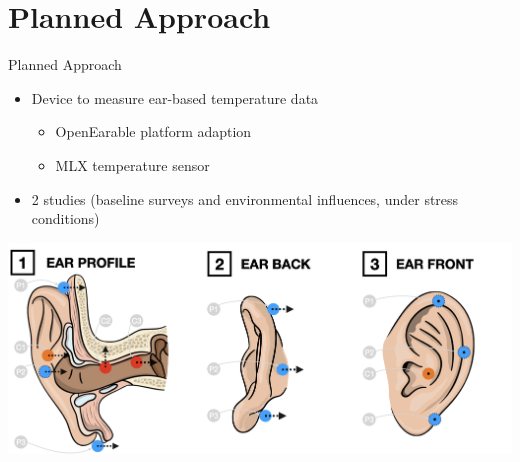 \documentclass[en]{sdqbeamer}
\begin{document}

\section{Planned Approach}
\begin{frame}{Planned Approach}
    \begin{itemize}
        \item Device to measure ear-based temperature data
        \begin{itemize}
            \item OpenEarable platform adaption
            \item MLX temperature sensor
        \end{itemize}
        \item 2 studies (baseline surveys and environmental influences, under stress conditions)
    \end{itemize}
    \begin{center}
        \includegraphics[scale=0.17]{../thesis-doc/images/ear_measurement_points/emp.png}    
    \end{center}
\end{frame}
\end{document}
